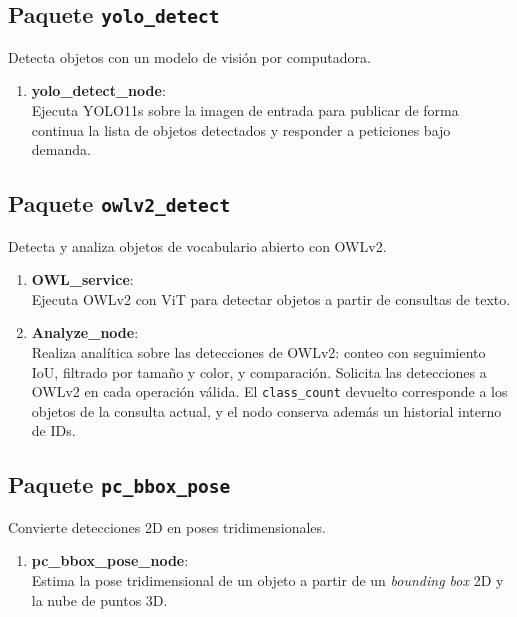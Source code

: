 \subsection{Paquete \texttt{yolo\_detect}}
Detecta objetos con un modelo de visión por computadora.

\begin{enumerate}
    \item \textbf{yolo\_detect\_node}: \\
    Ejecuta YOLO11s sobre la imagen de entrada para publicar de forma continua la lista de objetos detectados y responder a peticiones bajo demanda.
\end{enumerate}

\subsection{Paquete \texttt{owlv2\_detect}}
Detecta y analiza objetos de vocabulario abierto con OWLv2.

\begin{enumerate}
    \item \textbf{OWL\_service}: \\
    Ejecuta OWLv2 con ViT para detectar objetos a partir de consultas de texto.

    \item \textbf{Analyze\_node}: \\
    Realiza analítica sobre las detecciones de OWLv2: conteo con seguimiento IoU, filtrado por tamaño y color, y comparación. Solicita las detecciones a OWLv2 en cada operación válida. El \texttt{class\_count} devuelto corresponde a los objetos de la consulta actual, y el nodo conserva además un historial interno de IDs.
\end{enumerate}

\subsection{Paquete \texttt{pc\_bbox\_pose}}
Convierte detecciones 2D en poses tridimensionales.

\begin{enumerate}
    \item \textbf{pc\_bbox\_pose\_node}: \\
    Estima la pose tridimensional de un objeto a partir de un \textit{bounding box} 2D y la nube de puntos 3D.
\end{enumerate}


